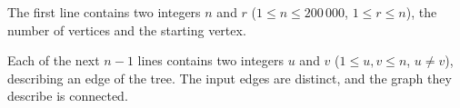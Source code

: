 The first line contains two integers $n$ and $r$ ($1 \le n \le 200\,000$, $1 \le r \le n$), the number of vertices and the starting vertex.

Each of the next $n-1$ lines contains two integers $u$ and $v$ ($1 \le u,v \le n$, $u \ne v$), describing an edge of the tree. The input edges are distinct, and the graph they describe is connected.
